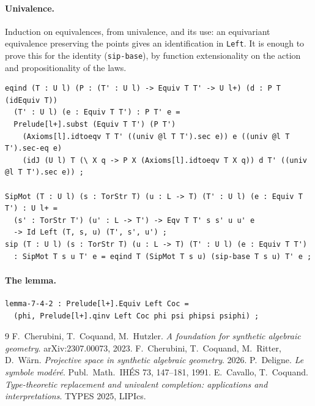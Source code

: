 \documentclass[11pt]{article}
\theoremstyle{remark}
\begin{document}
\paragraph{Univalence.} Induction on equivalences, from univalence, and
its use: an equivariant equivalence preserving the points gives an
identification in \verb|Left|. It is enough to prove this for the
identity (\verb|sip-base|), by function extensionality on the action
and propositionality of the laws.
{\footnotesize
\begin{verbatim}
eqind (T : U l) (P : (T' : U l) -> Equiv T T' -> U l+) (d : P T (idEquiv T))
  (T' : U l) (e : Equiv T T') : P T' e =
  Prelude[l+].subst (Equiv T T') (P T')
    (Axioms[l].idtoeqv T T' ((univ @l T T').sec e)) e ((univ @l T T').sec-eq e)
    (idJ (U l) T (\ X q -> P X (Axioms[l].idtoeqv T X q)) d T' ((univ @l T T').sec e)) ;

SipMot (T : U l) (s : TorStr T) (u : L -> T) (T' : U l) (e : Equiv T T') : U l+ =
  (s' : TorStr T') (u' : L -> T') -> Eqv T T' s s' u u' e
  -> Id Left (T, s, u) (T', s', u') ;
sip (T : U l) (s : TorStr T) (u : L -> T) (T' : U l) (e : Equiv T T')
  : SipMot T s u T' e = eqind T (SipMot T s u) (sip-base T s u) T' e ;
\end{verbatim}}

\paragraph{The lemma.}
{\footnotesize
\begin{verbatim}
lemma-7-4-2 : Prelude[l+].Equiv Left Coc =
  (phi, Prelude[l+].qinv Left Coc phi psi phipsi psiphi) ;
\end{verbatim}}

\begin{thebibliography}{9}
 F.~Cherubini, T.~Coquand, M.~Hutzler.
  \emph{A foundation for synthetic algebraic geometry}.
  arXiv:2307.00073, 2023.
 F.~Cherubini, T.~Coquand, M.~Ritter, D.~W\"arn.
  \emph{Projective space in synthetic algebraic geometry}. 2026.
 P.~Deligne. \emph{Le symbole mod\'er\'e}.
  Publ.\ Math.\ IH\'ES 73, 147--181, 1991.
 E.~Cavallo, T.~Coquand.
  \emph{Type-theoretic replacement and univalent completion: applications
  and interpretations}. TYPES 2025, LIPIcs.
\end{thebibliography}
\end{document}
